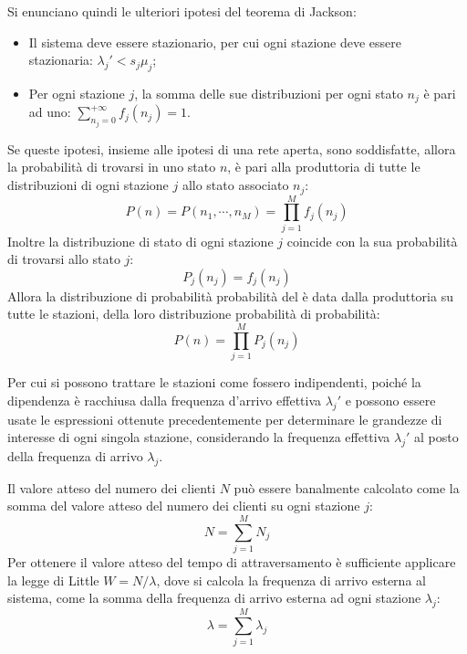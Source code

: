 \documentclass{article}
\numberwithin{equation}{subsection}
\begin{document}
Si enunciano quindi le ulteriori ipotesi del teorema di Jackson:
\begin{itemize}
    \item Il sistema deve essere stazionario, per cui ogni stazione deve essere stazionaria: $\lambda_j'<s_j\mu_j$;
    \item Per ogni stazione $j$, la somma delle sue distribuzioni per ogni stato $n_j$ è pari ad uno: $\displaystyle\sum_{n_j=0}^{+\infty}f_j(n_j)=1$.
\end{itemize}
Se queste ipotesi, insieme alle ipotesi di una rete aperta, sono soddisfatte, allora la probabilità di trovarsi in uno stato $n$, è pari alla produttoria di tutte le 
distribuzioni di ogni stazione $j$ allo stato associato $n_j$:
\begin{equation*}
    P(n)=P(n_1,\cdots,n_M)=\displaystyle\prod_{j=1}^Mf_j(n_j)
\end{equation*} 
Inoltre la distribuzione di stato di ogni stazione $j$ coincide con la sua probabilità di trovarsi allo stato $j$:
\begin{equation*}
    P_j(n_j)=f_j(n_j)
\end{equation*}
Allora la distribuzione di probabilità probabilità del è data dalla produttoria su tutte le stazioni, della loro distribuzione probabilità di probabilità: 
\begin{equation}
    P(n)=\displaystyle\prod_{j=1}^MP_j(n_j)
\end{equation}

Per cui si possono trattare le stazioni come fossero indipendenti, poiché la dipendenza è racchiusa dalla frequenza d'arrivo effettiva $\lambda_j'$ e possono essere usate le 
espressioni ottenute precedentemente per determinare le grandezze di interesse di ogni singola stazione, considerando la frequenza effettiva $\lambda_j'$ al posto della 
frequenza di arrivo $\lambda_j$. 


Il valore atteso del numero dei clienti $N$ può essere banalmente calcolato come la somma del valore atteso del numero dei clienti su ogni stazione $j$:
\begin{equation}
    N=\displaystyle\sum_{j=1}^MN_j
\end{equation}
Per ottenere il valore atteso del tempo di attraversamento è sufficiente applicare la legge di Little $W=N/\lambda$, dove si calcola la frequenza di arrivo esterna al sistema, 
come la somma della frequenza di arrivo esterna ad ogni stazione $\lambda_j$:
\begin{equation*}
    \lambda=\displaystyle\sum_{j=1}^M\lambda_j
\end{equation*}
\end{document}

